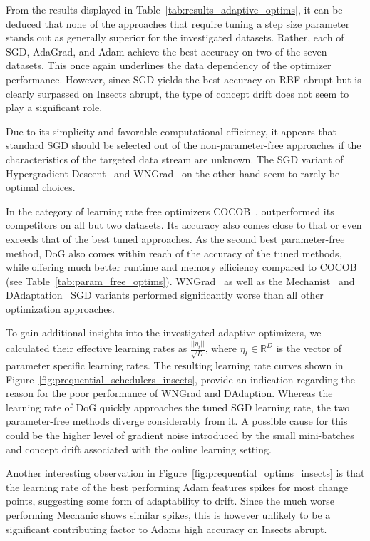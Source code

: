 \documentclass[letterpaper]{article} %
\begin{document}
From the results displayed in Table~\ref{tab:results_adaptive_optims}, it can be deduced that none of the approaches that require tuning a step size parameter stands out as generally superior for the investigated datasets.
Rather, each of SGD, AdaGrad, and Adam achieve the best accuracy on two of the seven datasets.  This once again underlines the data dependency of the optimizer performance.
However, since SGD yields the best accuracy on RBF abrupt but is clearly surpassed on Insects abrupt, the type of concept drift does not seem to play a significant role.

Due to its simplicity and favorable computational efficiency, it appears that standard SGD should be selected out of the non-parameter-free approaches if the characteristics of the targeted data stream are unknown.
The SGD variant of Hypergradient Descent~\cite{baydinOnlineLearningRate2018} and WNGrad~\cite{wuWNGradLearnLearning2020} on the other hand seem to rarely be optimal choices.

In the category of learning rate free optimizers COCOB~\cite{orabonaTrainingDeepNetworks2017}, outperformed its competitors on all but two datasets.
Its accuracy also comes close to that or even exceeds that of the best tuned approaches.
As the second best parameter-free method, DoG also comes within reach of the accuracy of the tuned methods, while offering much better runtime and memory efficiency compared to COCOB (see Table~\ref{tab:param_free_optims}).
WNGrad~\cite{wuWNGradLearnLearning2020} as well as the Mechanist~\cite{cutkoskyMechanicLearningRate2023} and DAdaptation~\cite{defazioLearningRateFreeLearningDAdaptation2023a} SGD variants performed significantly worse than all other optimization approaches.

To gain additional insights into the investigated adaptive optimizers, we calculated their effective learning rates as $\frac{||\eta_t||}{\sqrt{D}}$, where $\eta_t \in \mathbb{R}^D$ is the vector of parameter specific learning rates.
The resulting learning rate curves shown in Figure~\ref{fig:prequential_schedulers_insects}, provide an indication regarding the reason for the poor performance of WNGrad and DAdaption.
Whereas the learning rate of DoG quickly approaches the tuned SGD learning rate, the two parameter-free methods diverge considerably from it.
A possible cause for this could be the higher level of gradient noise introduced by the small mini-batches and concept drift associated with the online learning setting.

Another interesting observation in Figure~\ref{fig:prequential_optims_insects} is that the learning rate of the best performing Adam features spikes for most change points, suggesting some form of adaptability to drift.
Since the much worse performing Mechanic shows similar spikes, this is however unlikely to be a significant contributing factor to Adams high accuracy on Insects abrupt.
\end{document}
